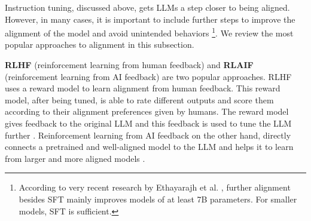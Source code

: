 \documentclass[conference]{IEEEtran}
\begin{document}
Instruction tuning, discussed above, gets LLMs a step closer to being aligned. However, in many cases, it is important to include further steps to improve the alignment of the model and avoid unintended behaviors \footnote{According to very recent research by Ethayarajh et al. \cite{KTO}, further alignment besides SFT mainly improves models of at least 7B parameters. For smaller models, SFT is sufficient.}. We review the most popular approaches to alignment in this subsection.



\textbf{RLHF} (reinforcement learning from human feedback) and  \textbf{RLAIF} (reinforcement learning from AI feedback) are two popular approaches. RLHF uses a reward model to learn alignment from human feedback. This reward model, after being tuned, is able to rate different outputs and score them according to their alignment preferences given by humans. The reward model gives feedback to the original LLM and this feedback is used to tune the LLM further \cite{christiano2017deep}. Reinforcement learning from AI feedback on the other hand, directly connects a pretrained and well-aligned model to the LLM and helps it to learn from larger and more aligned models \cite{lee2023rlaif}.
\end{document}
